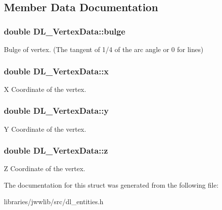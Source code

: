 \subsection{Member Data Documentation}
\hypertarget{structDL__VertexData_ac9367972a432ffeecdcc44aceca016c4}{
\subsubsection[{bulge}]{\setlength{\rightskip}{0pt plus 5cm}double D\-L\-\_\-\-Vertex\-Data\-::bulge}}\label{structDL__VertexData_ac9367972a432ffeecdcc44aceca016c4}
Bulge of vertex. (The tangent of 1/4 of the arc angle or 0 for lines) \hypertarget{structDL__VertexData_a168a957a0d90f9e70fd15ac425cff96e}{
\subsubsection[{x}]{\setlength{\rightskip}{0pt plus 5cm}double D\-L\-\_\-\-Vertex\-Data\-::x}}\label{structDL__VertexData_a168a957a0d90f9e70fd15ac425cff96e}
X Coordinate of the vertex. \hypertarget{structDL__VertexData_a694708acaf3c4098655b4a2935ba73b3}{
\subsubsection[{y}]{\setlength{\rightskip}{0pt plus 5cm}double D\-L\-\_\-\-Vertex\-Data\-::y}}\label{structDL__VertexData_a694708acaf3c4098655b4a2935ba73b3}
Y Coordinate of the vertex. \hypertarget{structDL__VertexData_ad0b4cb8d62a48d311eac86dbd05fd994}{
\subsubsection[{z}]{\setlength{\rightskip}{0pt plus 5cm}double D\-L\-\_\-\-Vertex\-Data\-::z}}\label{structDL__VertexData_ad0b4cb8d62a48d311eac86dbd05fd994}
Z Coordinate of the vertex. 

The documentation for this struct was generated from the following file\-:\begin{DoxyCompactItemize}
\item 
libraries/jwwlib/src/dl\-\_\-entities.\-h\end{DoxyCompactItemize}
